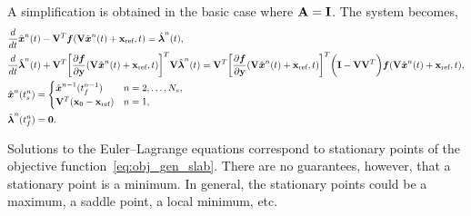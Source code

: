 A simplification is obtained in the basic case %
where $\mathbf{A} = \mathbf{I}$.
The system becomes,
\begin{align*}\label{eq:lspg_continuous_simle} & \frac{d}{dt} \hat{ \boldsymbol x}^{n}(t)   -
\mathbf {V}^T  \boldsymbol f(\mathbf {V} \hat{ \boldsymbol x}^{n}(t) + \mathbf{x}_\text{ref},t) =  \hat{\boldsymbol \lambda}^{n}(t) , \\
 &\frac{d}{dt} \hat{\boldsymbol \lambda}^{n}(t)  + \mathbf {V}^T \bigg[\frac{\partial
\boldsymbol f}{\partial \mathbf{y}}(\mathbf {V} \hat{ \boldsymbol x}^{n}(t) +
\mathbf{x}_\text{ref},t)\bigg]^T \mathbf {V} \hat{\boldsymbol \lambda}^{n}(t) = \mathbf {V}^T \bigg[
\frac{\partial \boldsymbol f}{\partial \mathbf{y}} (\mathbf {V} \hat{ \boldsymbol x}^{n}(t) +
\mathbf{x}_\text{ref},t) \bigg]^T \bigg( \mathbf{I} -   \mathbf {V} \mathbf {V}^T
\bigg)    \boldsymbol f(\mathbf {V} \hat{ \boldsymbol x}^{n}(t) + \mathbf{x}_\text{ref},t) , \\ & \hat{ \boldsymbol x}^{n}(t_s^{n}) =
\begin{cases} \hat{ \boldsymbol x}^{n-1}(t_f^{n-1}) & n=2,\ldots,N_s, \\
\mathbf {V}^T({{\mathbf{x}}_0} - \mathbf{x}_\text{ref}) & n=1, \end{cases}\\
&\hat{\boldsymbol \lambda}^{n}(t_f^{n}) = \boldsymbol 0 .  \end{align*}
\begin{remark}
Solutions to the Euler--Lagrange equations correspond to stationary points 
of the objective function~\eqref{eq:obj_gen_slab}. There are no guarantees, 
however, that a stationary point is a minimum. In general, the stationary 
points could be a maximum, a saddle point, a local minimum, etc.
\end{remark}

